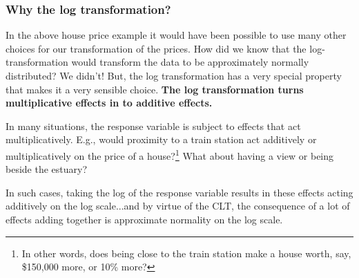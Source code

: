 \documentclass{beamer}\usepackage[]{graphicx}\usepackage[]{xcolor}
\begin{document}


\begin{frame}[fragile]
\frametitle{Why the log transformation?}
In the above house price example it would have been possible to use many other choices for our transformation of the prices. How did we know that the log-transformation would transform the data to be approximately normally distributed? We didn't! But, the log transformation has a very special property that makes it a very sensible choice.
{\bf The log transformation turns multiplicative effects in to additive effects.}
\medskip

In many situations, the response variable is subject to effects that act multiplicatively. E.g., would proximity to a train station act additively or multiplicatively on the price of a house?\footnote{In other words, does being close to the train station make a house worth, say, \$150,000 more, or 10\% more?} What about having a view or being beside the estuary?
\medskip

In such cases, taking the log of the response variable results in these effects acting additively on the log scale...and by virtue of the CLT, the consequence of a lot of effects adding together is approximate normality on the log scale.

\end{frame}
\end{document}
